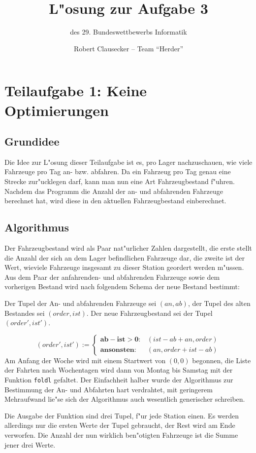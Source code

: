 \documentclass{scrreprt}
\author {Robert Clausecker -- Team "`Herder"'}
\title {L"osung zur Aufgabe 3}
\subtitle {des 29. Bundeswettbewerbs Informatik}
\begin{document}
\maketitle

\chapter {Teilaufgabe 1: Keine Optimierungen}

\section {Grundidee}
Die Idee zur L"osung dieser Teilaufgabe ist es, pro Lager nachzuschauen, wie
viele Fahrzeuge pro Tag an- bzw. abfahren.  Da ein Fahrzeug pro Tag genau eine
Strecke zur"ucklegen darf, kann man nun eine Art Fahrzeugbestand f"uhren.
Nachdem das Programm die Anzahl der an- und abfahrenden Fahrzeuge berechnet
hat, wird diese in den aktuellen Fahrzeugbestand einberechnet.

\section {Algorithmus}
Der Fahrzeugbestand wird als Paar nat"urlicher Zahlen dargestellt, die
erste stellt die Anzahl der sich an dem Lager befindlichen Fahrzeuge dar, die
zweite ist der Wert, wieviele Fahrzeuge insgesamt zu dieser Station geordert
werden m"ussen.  Aus dem Paar der anfahrenden- und abfahrenden Fahrzeuge sowie
dem vorherigen Bestand wird nach folgendem Schema der neue Bestand bestimmt:

Der Tupel der An- und abfahrenden Fahrzeuge sei $(an,ab)$, der
Tupel des alten Bestandes sei $(order,ist)$. Der neue Fahrzeugbestand sei
der Tupel $(order',ist')$.

$$
(order',ist') := \left \{\begin{array}{rl}
\mathbf{ab - ist > 0:} & (ist - ab + an, order)
\\
\mathbf{ansonsten:}    & (an, order + ist - ab)
\end{array}\right .$$
Am Anfang der Woche wird mit einem Startwert von $(0,0)$ begonnen, die Liste der
Fahrten nach Wochentagen wird dann von Montag bis Samstag mit der Funktion
\texttt{foldl} gefaltet.  Der Einfachheit halber wurde der Algorithmus zur
Bestimmung der An- und Abfahrten hart verdrahtet, mit geringerem Mehraufwand
lie"se sich der Algorithmus auch wesentlich generischer schreiben.

Die Ausgabe der Funktion sind drei Tupel, f"ur jede Station einen.  Es werden
allerdings nur die ersten Werte der Tupel gebraucht, der Rest wird am Ende
verworfen. Die Anzahl der nun wirklich ben"otigten Fahrzeuge ist die Summe jener
drei Werte.
\end{document}
